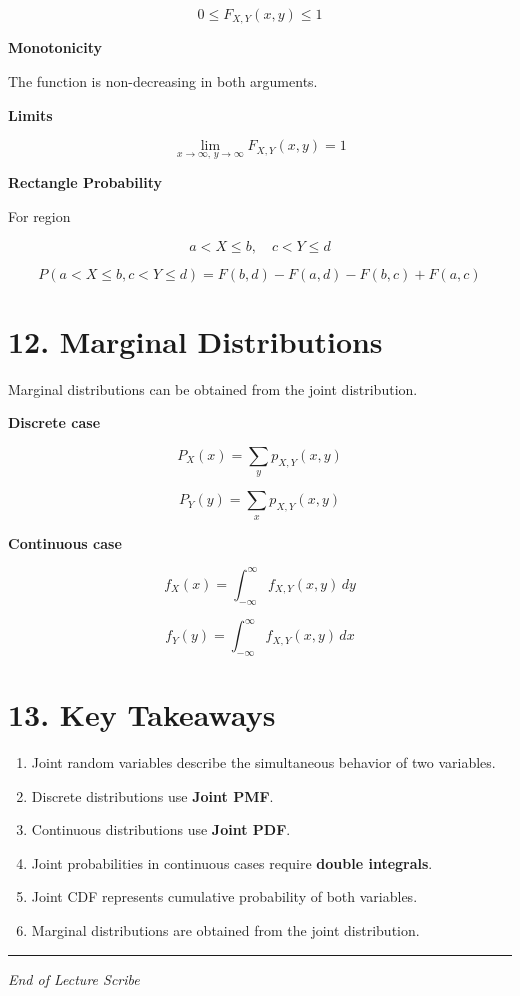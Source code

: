 \documentclass[11pt]{article}
\begin{document}
\[
0 \le F_{X,Y}(x,y) \le 1
\]

\textbf{Monotonicity}

The function is non-decreasing in both arguments.

\textbf{Limits}

\[
\lim_{x\to\infty,\,y\to\infty} F_{X,Y}(x,y)=1
\]

\textbf{Rectangle Probability}

For region

\[
a<X\le b,\quad c<Y\le d
\]

\[
P(a<X\le b, c<Y\le d)=F(b,d)-F(a,d)-F(b,c)+F(a,c)
\]

\section*{12. Marginal Distributions}

Marginal distributions can be obtained from the joint distribution.

\textbf{Discrete case}

\[
P_X(x)=\sum_y p_{X,Y}(x,y)
\]

\[
P_Y(y)=\sum_x p_{X,Y}(x,y)
\]

\textbf{Continuous case}

\[
f_X(x)=\int_{-\infty}^{\infty} f_{X,Y}(x,y)\,dy
\]

\[
f_Y(y)=\int_{-\infty}^{\infty} f_{X,Y}(x,y)\,dx
\]

\section*{13. Key Takeaways}

\begin{enumerate}
\item Joint random variables describe the simultaneous behavior of two variables.
\item Discrete distributions use \textbf{Joint PMF}.
\item Continuous distributions use \textbf{Joint PDF}.
\item Joint probabilities in continuous cases require \textbf{double integrals}.
\item Joint CDF represents cumulative probability of both variables.
\item Marginal distributions are obtained from the joint distribution.
\end{enumerate}

\bigskip
\hrule
\vspace{0.2cm}

\begin{center}
\small \textit{End of Lecture Scribe}
\end{center}
\end{document}
